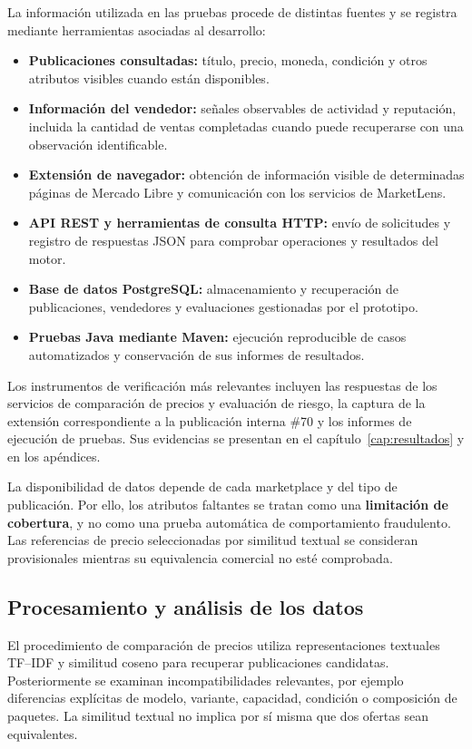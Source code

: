 La información utilizada en las pruebas procede de distintas fuentes y se registra mediante herramientas asociadas al desarrollo:

\begin{itemize}
    \item \textbf{Publicaciones consultadas:} título, precio, moneda, condición y otros atributos visibles cuando están disponibles.
    \item \textbf{Información del vendedor:} señales observables de actividad y reputación, incluida la cantidad de ventas completadas cuando puede recuperarse con una observación identificable.
    \item \textbf{Extensión de navegador:} obtención de información visible de determinadas páginas de Mercado Libre y comunicación con los servicios de MarketLens.
    \item \textbf{API REST y herramientas de consulta HTTP:} envío de solicitudes y registro de respuestas JSON para comprobar operaciones y resultados del motor.
    \item \textbf{Base de datos PostgreSQL:} almacenamiento y recuperación de publicaciones, vendedores y evaluaciones gestionadas por el prototipo.
    \item \textbf{Pruebas Java mediante Maven:} ejecución reproducible de casos automatizados y conservación de sus informes de resultados.
\end{itemize}

Los instrumentos de verificación más relevantes incluyen las respuestas de los servicios de comparación de precios y evaluación de riesgo, la captura de la extensión correspondiente a la publicación interna \#70 y los informes de ejecución de pruebas. Sus evidencias se presentan en el capítulo~\ref{cap:resultados} y en los apéndices.

La disponibilidad de datos depende de cada marketplace y del tipo de publicación. Por ello, los atributos faltantes se tratan como una \textbf{limitación de cobertura}, y no como una prueba automática de comportamiento fraudulento. Las referencias de precio seleccionadas por similitud textual se consideran provisionales mientras su equivalencia comercial no esté comprobada.

\subsection{Procesamiento y análisis de los datos}\label{subsec:ml-procesamiento}

El procedimiento de comparación de precios utiliza representaciones textuales TF--IDF y similitud coseno para recuperar publicaciones candidatas. Posteriormente se examinan incompatibilidades relevantes, por ejemplo diferencias explícitas de modelo, variante, capacidad, condición o composición de paquetes. La similitud textual no implica por sí misma que dos ofertas sean equivalentes.

